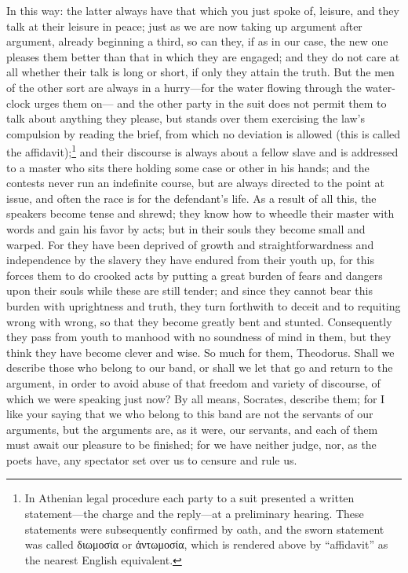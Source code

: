 \documentclass[letterpaper,12pt]{article}
\newcommand{\textgreek}[1]{\begingroup\fontencoding{LGR}\selectfont#1\endgroup}
\newcommand{\stephpag}[1]{\marginnote{\small\itshape\fontfamily{ppl}\selectfont #1}}
\begin{document}
\begin{drama}
In this way: the latter always have that which you just spoke of, leisure, and they talk at their leisure in peace; just as we are now taking up argument after argument, already beginning a third, so can they, if as in our case, the new one pleases them better than that in which they are engaged; and they do not care at all whether their talk is long or short, if only they attain the truth. But the men of the other sort are always in a hurry—for the water flowing through the water-clock urges them on— \stephpag{e} and the other party in the suit does not permit them to talk about anything they please, but stands over them exercising the law's compulsion by reading the brief, from which no deviation is allowed (this is called the affidavit);\footnote{In Athenian legal procedure each party to a suit presented a written statement—the charge and the reply—at a preliminary hearing. These statements were subsequently confirmed by oath, and the sworn statement was called \textgreek{διωμοσία} or \textgreek{ἀντωμοσία}, which is rendered above by ``affidavit'' as the nearest English equivalent.} and their discourse is always about a fellow slave and is addressed to a master who sits there holding some case or other in his hands; and the contests never run an indefinite course, but are always directed to the point at issue, and often the race is for the defendant's life. \stephpag{173 a} As a result of all this, the speakers become tense and shrewd; they know how to wheedle their master with words and gain his favor by acts; but in their souls they become small and warped. For they have been deprived of growth and straightforwardness and independence by the slavery they have endured from their youth up, for this forces them to do crooked acts by putting a great burden of fears and dangers upon their souls while these are still tender; and since they cannot bear this burden with uprightness and truth, they turn forthwith to deceit and to requiting wrong with wrong, so that they become greatly bent and stunted. \stephpag{b} Consequently they pass from youth to manhood with no soundness of mind in them, but they think they have become clever and wise. So much for them, Theodorus. Shall we describe those who belong to our band, or shall we let that go and return to the argument, in order to avoid abuse of that freedom and variety of discourse, of which we were speaking just now?
\theodorusspeaks
By all means, Socrates, describe them; \stephpag{c} for I like your saying that we who belong to this band are not the servants of our arguments, but the arguments are, as it were, our servants, and each of them must await our pleasure to be finished; for we have neither judge, nor, as the poets have, any spectator set over us to censure and rule us.

\end{drama}
\end{document}
